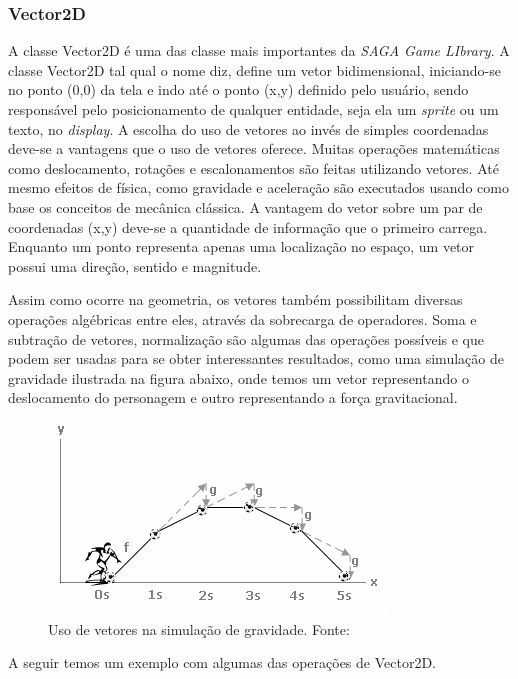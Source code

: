 \subsubsection{Vector2D}
%
%
A classe Vector2D é uma das classe mais importantes da \textit{SAGA Game LIbrary}. A classe Vector2D tal qual o nome diz, define um vetor bidimensional, iniciando-se no ponto (0,0) da tela e indo até o ponto (x,y) definido pelo usuário, sendo responsável pelo posicionamento de qualquer entidade, seja ela um \textit{sprite} ou um texto, no \textit{display}. A escolha do uso de vetores ao invés de simples coordenadas deve-se a vantagens que o uso de vetores oferece. Muitas operações matemáticas como deslocamento, rotações e escalonamentos são feitas utilizando vetores. Até mesmo efeitos de física, como gravidade e aceleração são executados usando como base os conceitos de mecânica clássica. A vantagem do vetor sobre um par de coordenadas (x,y) deve-se a quantidade de informação que o primeiro carrega. Enquanto um ponto representa apenas uma localização no espaço, um vetor possui uma direção, sentido e magnitude. 
\par 
Assim como ocorre na geometria, os vetores também possibilitam diversas operações algébricas entre eles, através da sobrecarga de operadores. Soma e subtração de vetores, normalização são algumas das operações possíveis e que podem ser usadas para se obter interessantes resultados, como uma simulação de gravidade ilustrada na figura abaixo, onde temos um vetor representando o deslocamento do personagem e outro representando a força gravitacional.
%
%
%
\begin{figure}[H]
    \centering
    \includegraphics[scale = 0.8]{Imagens/VetorGravidade.png}
    \caption{Uso de vetores na simulação de gravidade. Fonte: \cite{PontoV}}
    \label{VetorGravidade}
\end{figure}
%
%
A seguir temos um exemplo com algumas das operações de Vector2D.
%

%
%
